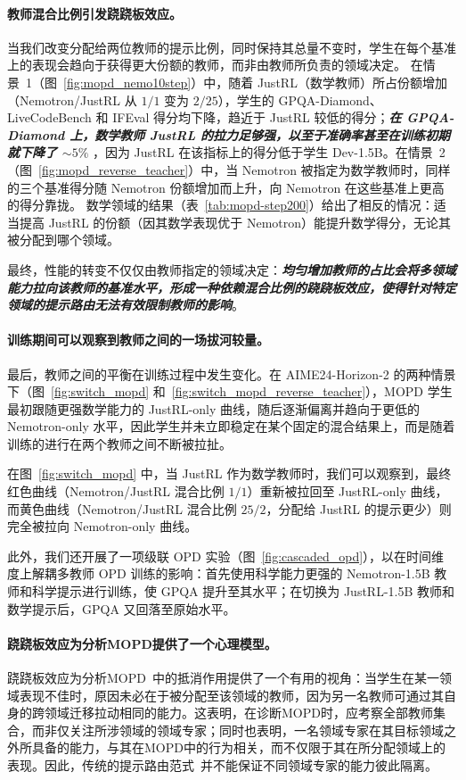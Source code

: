 \paragraph{教师混合比例引发跷跷板效应。}
当我们改变分配给两位教师的提示比例，同时保持其总量不变时，学生在每个基准上的表现会趋向于获得更大份额的教师，而非由教师所负责的领域决定。  
在情景~1（图~\ref{fig:mopd_nemo10step}）中，随着 JustRL（数学教师）所占份额增加（Nemotron/JustRL 从 $1/1$ 变为 $2/25$），学生的 GPQA-Diamond、LiveCodeBench 和 IFEval 得分均下降，趋近于 JustRL 较低的得分；\textbf{\emph{在 GPQA-Diamond 上，数学教师 JustRL 的拉力足够强，以至于准确率甚至在训练初期就下降了 $\sim5\%$ }}，因为 JustRL 在该指标上的得分低于学生 Dev-1.5B。在情景~2（图~\ref{fig:mopd_reverse_teacher}）中，当 Nemotron 被指定为数学教师时，同样的三个基准得分随 Nemotron 份额增加而上升，向 Nemotron 在这些基准上更高的得分靠拢。  
数学领域的结果（表~\ref{tab:mopd-step200}）给出了相反的情况：适当提高 JustRL 的份额（因其数学表现优于 Nemotron）能提升数学得分，无论其被分配到哪个领域。

最终，性能的转变不仅仅由教师指定的领域决定：\textbf{\emph{均匀增加教师的占比会将多领域能力拉向该教师的基准水平，形成一种依赖混合比例的跷跷板效应，使得针对特定领域的提示路由无法有效限制教师的影响}}。


\paragraph{训练期间可以观察到教师之间的一场拔河较量。}
最后，教师之间的平衡在训练过程中发生变化。在 AIME24-Horizon-2 的两种情景下（图~\ref{fig:switch_mopd} 和~\ref{fig:switch_mopd_reverse_teacher}），MOPD 学生最初跟随更强数学能力的 JustRL-only 曲线，随后逐渐偏离并趋向于更低的 Nemotron-only 水平，因此学生并未立即稳定在某个固定的混合结果上，而是随着训练的进行在两个教师之间不断被拉扯。

在图~\ref{fig:switch_mopd} 中，当 JustRL 作为数学教师时，我们可以观察到，最终红色曲线（Nemotron/JustRL 混合比例 $1/1$）重新被拉回至 JustRL-only 曲线，而黄色曲线（Nemotron/JustRL 混合比例 $25/2$，分配给 JustRL 的提示更少）则完全被拉向 Nemotron-only 曲线。

此外，我们还开展了一项级联 OPD 实验（图~\ref{fig:cascaded_opd}），以在时间维度上解耦多教师 OPD 训练的影响：首先使用科学能力更强的 Nemotron-1.5B 教师和科学提示进行训练，使 GPQA 提升至其水平；在切换为 JustRL-1.5B 教师和数学提示后，GPQA 又回落至原始水平。


\paragraph{跷跷板效应为分析MOPD提供了一个心理模型。}
跷跷板效应为分析MOPD~\citep{chen2026counteraction}中的抵消作用提供了一个有用的视角：当学生在某一领域表现不佳时，原因未必在于被分配至该领域的教师，因为另一名教师可通过其自身的跨领域迁移拉动相同的能力。这表明，在诊断MOPD时，应考察全部教师集合，而非仅关注所涉领域的领域专家；同时也表明，一名领域专家在其目标领域之外所具备的能力，与其在MOPD中的行为相关，而不仅限于其在所分配领域上的表现。因此，传统的提示路由范式~\citep{ma2026mopd,coreteam2026mimov2flashtechnicalreport,huang2026kat,xu2026deepseek}并不能保证不同领域专家的能力彼此隔离。

